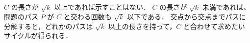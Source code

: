 \subsection{}
$C$ の長さが $\sqrt{k}$ 以上であれば示すことはない．
$C$ の長さが $\sqrt{k}$ 未満であれば、問題のパス $P$ が $C$ と交わる回数も $\sqrt{k}$ 以下である．
交点から交点までパスに分解すると，どれかのパスは $\sqrt{k}$ 以上の長さを持って，$C$ と合わせて求めたいサイクルが得られる．
